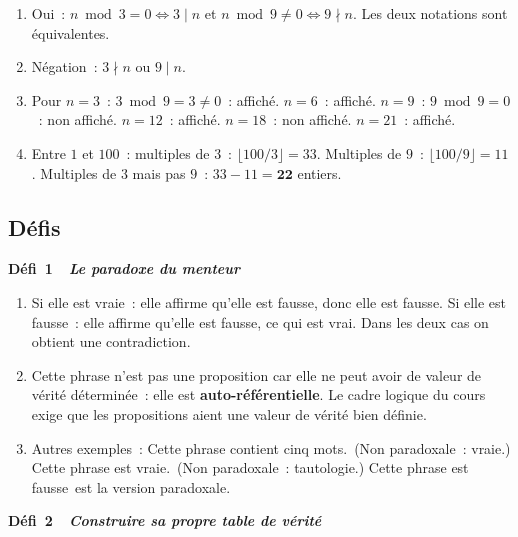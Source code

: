 
\begin{enumerate}
  \item Oui~: $n\bmod3=0\Leftrightarrow3\mid n$ et $n\bmod9\ne0\Leftrightarrow9\nmid n$.
        Les deux notations sont \'equivalentes.
  \item N\'egation~: \og$3\nmid n$ ou $9\mid n$\fg.
  \item Pour $n=3$~: $3\bmod9=3\ne0$~: affich\'e.
        $n=6$~: affich\'e. $n=9$~: $9\bmod9=0$~: non affich\'e.
        $n=12$~: affich\'e. $n=18$~: non affich\'e. $n=21$~: affich\'e.
  \item Entre $1$ et $100$~: multiples de $3$~: $\lfloor100/3\rfloor=33$.
        Multiples de $9$~: $\lfloor100/9\rfloor=11$.
        Multiples de $3$ mais pas $9$~: $33-11=\mathbf{22}$ entiers.
\end{enumerate}

\subsection*{D\'efis}

\noindent{}
{\color{BO}\bfseries\small D\'efi~1~\textendash\ \textit{Le paradoxe du menteur}}
\par\smallskip

\begin{enumerate}
  \item Si elle est vraie~: elle affirme qu'elle est fausse, donc elle est fausse.
        Si elle est fausse~: elle affirme qu'elle est fausse, ce qui est vrai.
        Dans les deux cas on obtient une contradiction.
  \item Cette phrase n'est pas une proposition car elle ne peut avoir de valeur de
        v\'erit\'e d\'etermin\'ee~: elle est \textbf{auto-r\'ef\'erentielle}.
        Le cadre logique du cours exige que les propositions aient une valeur de
        v\'erit\'e bien d\'efinie.
  \item Autres exemples~: \og Cette phrase contient cinq mots.\fg\
        (Non paradoxale~: vraie.) \og Cette phrase est vraie.\fg\
        (Non paradoxale~: tautologie.)
        \og Cette phrase est fausse\fg\ est la version paradoxale.
\end{enumerate}

\noindent{}
{\color{BO}\bfseries\small D\'efi~2~\textendash\ \textit{Construire sa propre table de v\'erit\'e}}
\par\smallskip

